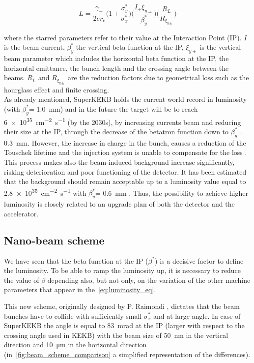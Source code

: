 \begin{equation} \label{eq:luminosity_eq}
L = \frac{\gamma_{\pm}}{2er_{e}} \bigg(1 + \frac{\sigma_{y}^{*}}{\sigma_{x}^{*}} \bigg) \bigg(\frac{I_{\pm}\xi_{y\pm}}{\beta^{*}_{y}} \bigg) \bigg(\frac{R_{L}}{R_{\xi_{y\pm}}} \bigg)
\end{equation}

where the starred parameters refer to their value at the Interaction Point (IP).  $I$ is the beam current, $\beta_{y}^{*}$ the vertical beta function at the IP, $\xi_{y\pm}$ is the vertical beam parameter which includes the horizontal beta function at the IP, the horizontal emittance, the bunch length and the crossing angle between the beams. $R_{L}$ and $R_{\xi_{y\pm}}$ are the reduction factors due to geometrical loss such as the hourglass effect and finite crossing.\\

As already mentioned, SuperKEKB holds the current world record in luminosity (with $\beta^{*}_{y}$= \SI{1.0}{mm}) and in the future the target will be to reach \SI{6e35}{cm^{-2} s^{-1}} (by the 2030s), by increasing currents beam and reducing their size at the IP, through the decrease of the betatron function down to $\beta^{*}_{y}$= \SI{0.3}{mm}. 
However, the increase in charge in the bunch, causes a reduction of the Touschek lifetime and the injection system is unable to compensate for the loss \cite{Iida:2023soe}.
This process makes also the beam-induced background increase significantly, risking deterioration and poor functioning of the detector.
It has been estimated that the background should remain acceptable up to a luminosity value equal to \SI{2.8e35}{cm^{-2} s^{-1}} with $\beta^{*}_{y}$= \SI{0.6}{mm} \cite{Natochii:2022vcs}. Thus, the possibility to achieve higher luminosity is closely related to an upgrade plan of both the detector and the accelerator.


\subsection{Nano-beam scheme} \label{sec:nano_beam}

We have seen that the beta function at the IP ($\beta^{*}$) is a decisive factor to define the luminosity. To be able to ramp the luminosity up, it is necessary to reduce the value of $\beta$ depending also, but not only, on the variation of the other machine parameters that appear in the~\autoref{eq:luminosity_eq}.


This new scheme, originally designed by P. Raimondi \cite{SuperB:2013cxb}, dictates that the beam bunches have to collide with sufficiently small $\sigma_{x}^{*}$ and at large angle. In case of SuperKEKB the angle is equal to \SI{83}{mrad} at the IP (larger with respect to the crossing angle used in KEKB) with the beam size of \SI{50}{nm} in the vertical direction and \SI{10}{\micro m} in the horizontal direction (in~\autoref{fig:beam_scheme_comparison} a simplified representation of the differences).


